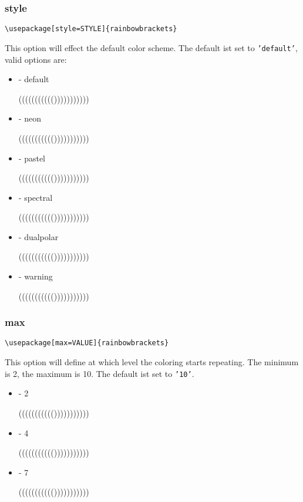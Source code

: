 \documentclass[10pt, a4paper]{article}
\newenvironment{itemizeexample}{
	\begin{itemize}
		\setlength\itemsep{-.5em}
	}
	{
	\end{itemize}
}
\begin{document}
	\subsubsection{style}\label{sub:style}
	\begin{lstlisting}[style=A]
			\usepackage[style=STYLE]{rainbowbrackets}
	\end{lstlisting}
	This option will effect the default color scheme. The default ist set to \texttt{'default'}, valid options are:
	\begin{itemizeexample}
		\item[-] default \begin{rb}((((((((((()))))))))))\end{rb}
		\item[-] neon \begin{rb}((((((((((()))))))))))\end{rb}
		\item[-] pastel \begin{rb}((((((((((()))))))))))\end{rb}
		\item[-] spectral \begin{rb}((((((((((()))))))))))\end{rb}
		\item[-] dualpolar \begin{rb}((((((((((()))))))))))\end{rb}
		\item[-] warning \begin{rb}((((((((((()))))))))))\end{rb}\rbresetstyle
	\end{itemizeexample}
	\subsubsection{max}
	\begin{lstlisting}[style=A]
			\usepackage[max=VALUE]{rainbowbrackets}
	\end{lstlisting}
	This option will define at which level the coloring starts repeating. The minimum is 2, the maximum is 10. The default ist set to \texttt{'10'}.
	\begin{itemizeexample}
		\item[-] 2 \begin{rb}((((((((((()))))))))))\end{rb}
		\item[-] 4 \begin{rb}((((((((((()))))))))))\end{rb}
		\item[-] 7 \begin{rb}((((((((((()))))))))))\end{rb}
	\end{itemizeexample}
\end{document}
